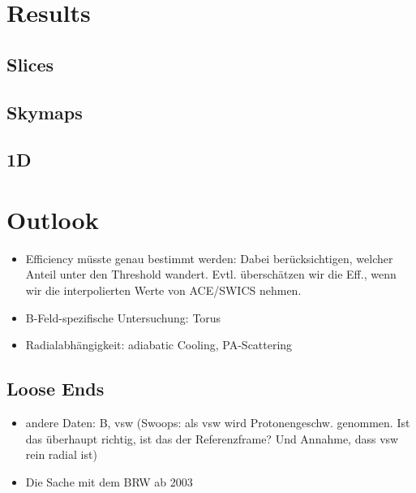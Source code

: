%
%
%
\section{Results}
\subsection{Slices}
\subsection{Skymaps}
\subsection{1D}



%
%
%
\section{Outlook}
\begin{itemize}
	\item Efficiency müsste genau bestimmt werden: Dabei berücksichtigen, welcher Anteil unter den Threshold wandert. Evtl. überschätzen wir die Eff., wenn wir die interpolierten Werte von ACE/SWICS nehmen.
	\item B-Feld-spezifische Untersuchung: Torus
	\item Radialabhängigkeit: adiabatic Cooling, PA-Scattering

\end{itemize}







\subsection{Loose Ends}
\begin{itemize}
	\item andere Daten: B, vsw (Swoops: als vsw wird Protonengeschw. genommen. Ist das überhaupt richtig, ist das der Referenzframe? Und Annahme, dass vsw rein radial ist)
	\item Die Sache mit dem BRW ab 2003
\end{itemize}

